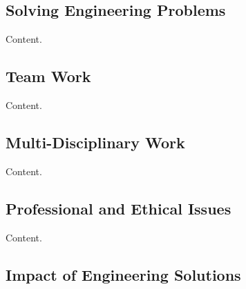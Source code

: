 \documentclass[10pt]{article}
\begin{document}
\subsection{Solving Engineering Problems}


Content.

\subsection{Team Work}


Content.

\subsection{Multi-Disciplinary Work}


Content.

\subsection{Professional and Ethical Issues}


Content.

\subsection{Impact of Engineering Solutions}
\end{document}
